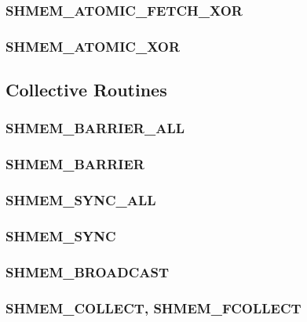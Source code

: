 \documentclass[10pt]{book}
\begin{document}
\subsubsection{\textbf{SHMEM\_ATOMIC\_FETCH\_XOR}}
\label{subsec:shmem_atomic_fetch_xor}


\subsubsection{\textbf{SHMEM\_ATOMIC\_XOR}}
\label{subsec:shmem_atomic_xor}






\subsection{Collective Routines}\label{subsec:coll}


\subsubsection{\textbf{SHMEM\_BARRIER\_ALL}}\label{subsec:shmem_barrier_all}


\subsubsection{\textbf{SHMEM\_BARRIER}}\label{subsec:shmem_barrier}


\subsubsection{\textbf{SHMEM\_SYNC\_ALL}}\label{subsec:shmem_sync_all}


\subsubsection{\textbf{SHMEM\_SYNC}}\label{subsec:shmem_sync}


\subsubsection{\textbf{SHMEM\_BROADCAST}}\label{subsec:shmem_broadcast}


\subsubsection{\textbf{SHMEM\_COLLECT, SHMEM\_FCOLLECT}}\label{subsec:shmem_collect}

\end{document}
